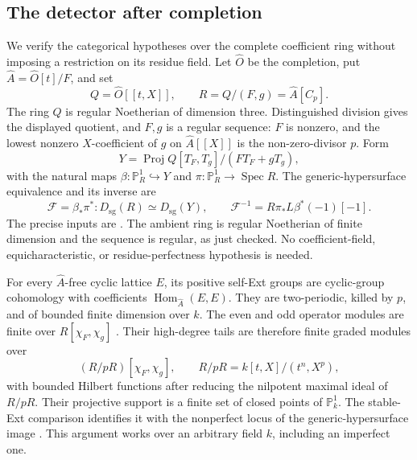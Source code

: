 \subsection{The detector after completion}

We verify the categorical hypotheses over the complete coefficient
ring without imposing a restriction on its residue field.
Let \(\widehat O\) be the completion, put
\(\widehat A=\widehat O[t]/F\), and set
\[
 Q=\widehat O[[t,X]],\qquad R=Q/(F,g)=\widehat A[C_p].
\]
The ring \(Q\) is regular Noetherian of dimension three.
Distinguished division gives the displayed quotient, and \(F,g\)
is a regular sequence: \(F\) is nonzero, and the lowest nonzero
\(X\)-coefficient of \(g\) on \(\widehat A[[X]]\) is the
non-zero-divisor \(p\).  Form
\[
 Y=\operatorname{Proj}Q[T_F,T_g]/(FT_F+gT_g),
\]
with the natural maps
\(\beta:\mathbb P^1_R\hookrightarrow Y\) and
\(\pi:\mathbb P^1_R\to\operatorname{Spec}R\).
The generic-hypersurface equivalence and its inverse are
\begin{equation}\label{eq:singular-monic-generic-equivalence}
 \mathcal F=\beta_*\pi^*:D_{\mathrm{sg}}(R)
        \simeq D_{\mathrm{sg}}(Y),\qquad
 \mathcal F^{-1}=R\pi_*L\beta^*(-1)[-1].
\end{equation}
The precise inputs are \citet[Theorem 2.10, p.~8; the paragraph
after Corollary 2.11, p.~9; and the formula preceding (4.3),
p.~19]{BurkeWalker2012}.  The ambient ring is regular Noetherian
of finite dimension and the sequence is regular, as just checked.
No coefficient-field, equicharacteristic, or residue-perfectness
hypothesis is needed.

For every \(\widehat A\)-free cyclic lattice \(E\), its positive
self-Ext groups are cyclic-group cohomology with coefficients
\(\operatorname{Hom}_{\widehat A}(E,E)\).  They are two-periodic,
killed by \(p\), and of bounded finite dimension over \(k\).
The even and odd operator modules are finite over
\(R[\chi_F,\chi_g]\)
\citep[Remark 3.19, p.~17]{BurkeWalker2012}.
Their high-degree tails are therefore finite graded modules over
\[
 (R/pR)[\chi_F,\chi_g],\qquad
 R/pR=k[t,X]/(t^n,X^p),
\]
with bounded Hilbert functions after reducing the nilpotent maximal
ideal of \(R/pR\).  Their projective support is a finite set of
closed points of \(\mathbb P^1_k\).  The stable-Ext comparison
identifies it with the nonperfect locus of the generic-hypersurface
image \citep[Corollaries 3.18 and 3.20, pp.~17--18, and the end of
Section 8.1, pp.~33--34]{BurkeWalker2012}.  This argument works over
an arbitrary field \(k\), including an imperfect one.

